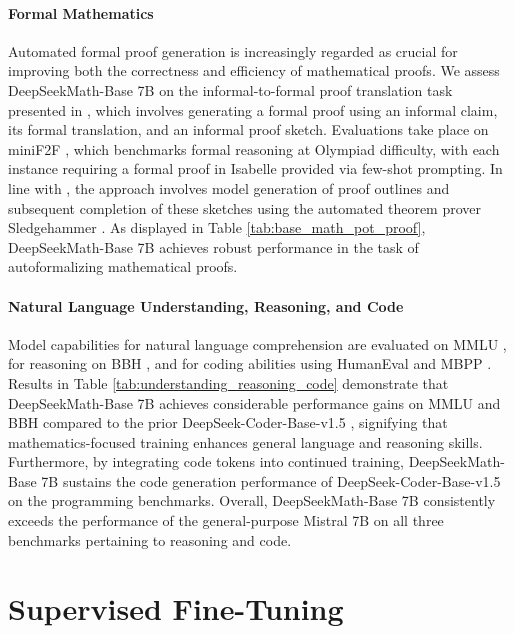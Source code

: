 \begin{itemize}[topsep=0pt]
\paragraph{Formal Mathematics}

Automated formal proof generation is increasingly regarded as crucial for improving both the correctness and efficiency of mathematical proofs. We assess DeepSeekMath-Base 7B on the informal-to-formal proof translation task presented in \citep{dsp_proof}, which involves generating a formal proof using an informal claim, its formal translation, and an informal proof sketch. Evaluations take place on miniF2F \citep{minif2f}, which benchmarks formal reasoning at Olympiad difficulty, with each instance requiring a formal proof in Isabelle provided via few-shot prompting. In line with \cite{dsp_proof}, the approach involves model generation of proof outlines and subsequent completion of these sketches using the automated theorem prover Sledgehammer \citep{sledgehammer}. As displayed in Table \ref{tab:base_math_pot_proof}, DeepSeekMath-Base 7B achieves robust performance in the task of autoformalizing mathematical proofs.

\paragraph{Natural Language Understanding, Reasoning, and Code}

Model capabilities for natural language comprehension are evaluated on MMLU \citep{mmlu}, for reasoning on BBH \citep{bbh}, and for coding abilities using HumanEval \citep{codex} and MBPP \citep{mbpp}. Results in Table \ref{tab:understanding_reasoning_code} demonstrate that DeepSeekMath-Base 7B achieves considerable performance gains on MMLU and BBH compared to the prior DeepSeek-Coder-Base-v1.5 \citep{deepseek-coder}, signifying that mathematics-focused training enhances general language and reasoning skills. Furthermore, by integrating code tokens into continued training, DeepSeekMath-Base 7B sustains the code generation performance of DeepSeek-Coder-Base-v1.5 on the programming benchmarks. Overall, DeepSeekMath-Base 7B consistently exceeds the performance of the general-purpose Mistral 7B \citep{mistral} on all three benchmarks pertaining to reasoning and code.

\section{Supervised Fine-Tuning}


\end{itemize}
